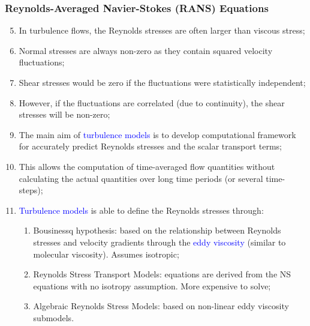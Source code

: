 \documentclass[10pt,compress]{beamer}
\newcommand{\blue}{\textcolor{blue}}
\begin{document}
\begin{frame}
 \frametitle{Reynolds-Averaged Navier-Stokes (RANS) Equations}
    \begin{enumerate}\setcounter{enumi}{4}%
       \item<1-> In turbulence flows, the Reynolds stresses are often larger than viscous stress;
       \item<1-> Normal stresses are always non-zero as they contain squared velocity fluctuations;
       \item<1-> Shear stresses would be zero if the fluctuations were statistically independent;
       \item<1-> However, if the fluctuations are correlated (due to continuity), the shear stresses will be non-zero;
       \item<2-> The main aim of \blue{turbulence models} is to develop computational framework for accurately predict Reynolds stresses and the scalar transport terms;
       \item<2-> This allows the computation of time-averaged flow quantities without calculating the actual quantities over long time periods (or several time-steps);
       \item<3-> \blue{Turbulence models} is able to define the Reynolds stresses through:
           \begin{enumerate}
                \item<3-> Bousinessq hypothesis: based on the relationship between Reynolds stresses and velocity gradients through the \blue{eddy viscosity} (similar to molecular viscosity). Assumes isotropic;
                \item<3-> Reynolds Stress Transport Models: equations are derived from the NS equations with no isotropy assumption. More expensive to solve; 
                \item<3-> Algebraic Reynolds Stress Models: based on non-linear eddy viscosity submodels.
                 
           \end{enumerate}
    \end{enumerate} 
\end{frame}
\end{document}
